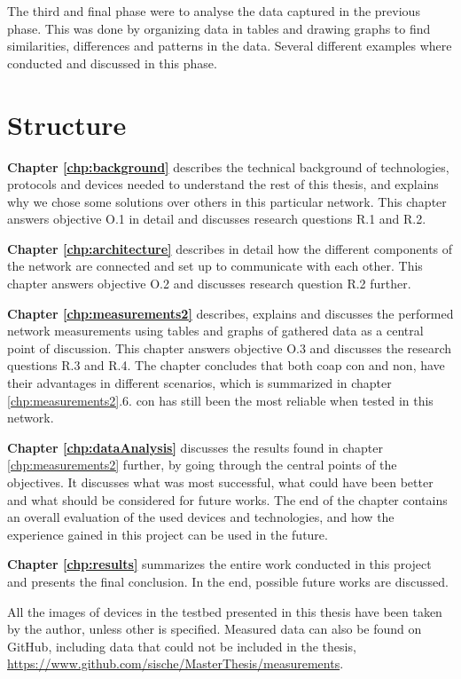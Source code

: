 \noindent The third and final phase were to analyse the data captured in the previous phase. This was done by organizing data in tables and drawing graphs to find similarities, differences and patterns in the data. Several different examples where conducted and discussed in this phase. 


\section{Structure}


\noindent \textbf{Chapter \ref{chp:background}} describes the technical background of technologies, protocols and devices needed to understand the rest of this thesis, and explains why we chose some solutions over others in this particular network. This chapter answers objective O.1 in detail and discusses research questions R.1 and R.2. 

\noindent \textbf{Chapter \ref{chp:architecture}} describes in detail how the different components of the network are connected and set up to communicate with each other. This chapter answers objective O.2 and discusses research question R.2 further. 

\noindent \textbf{Chapter \ref{chp:measurements2}} describes, explains and discusses the performed network measurements using tables and graphs of gathered data as a central point of discussion. This chapter answers objective O.3 and discusses the research questions R.3 and R.4. The chapter concludes that both \gls{coap} \gls{con} and \gls{non}, have their advantages in different scenarios, which is summarized in chapter \ref{chp:measurements2}.6. \gls{con} has still been the most reliable when tested in this network. 

\noindent \textbf{Chapter \ref{chp:dataAnalysis}} discusses the results found in chapter \ref{chp:measurements2} further, by going through the central points of the objectives. It discusses what was most successful, what could have been better and what should be considered for future works. The end of the chapter contains an overall evaluation of the used devices and technologies, and how the experience gained in this project can be used in the future. 

\noindent \textbf{Chapter \ref{chp:results}} summarizes the entire work conducted in this project and presents the final conclusion. In the end, possible future works are discussed. 

\noindent All the images of devices in the testbed presented in this thesis have been taken by the author, unless other is specified. Measured data can also be found on GitHub, including data that could not be included in the thesis, \url{https://www.github.com/sische/MasterThesis/measurements}. 





